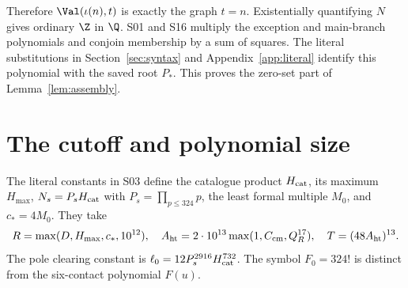 Therefore $\Val(\iota(n),t)$ is exactly the graph $t=n$.
Existentially quantifying $N$ gives ordinary $\Z$ in $\Q$.
S01 and S16 multiply the exception and main-branch polynomials and
conjoin membership by a sum of squares. The literal substitutions in
Section~\ref{sec:syntax} and Appendix~\ref{app:literal} identify this
polynomial with the saved root $P_*$. This proves the zero-set part of
Lemma~\ref{lem:assembly}.



\section{The cutoff and polynomial size}\label{sec:size}
The literal constants in S03 define the catalogue product $H_{\rm cat}$,
its maximum $H_{\max}$, $N_s=P_sH_{\rm cat}$ with
$P_s=\prod_{p\le324}p$, the least formal multiple $M_0$, and $c_*=4M_0$.
They take
\[
 R=\max(D,H_{\max},c_*,10^{12}),\quad
 A_{\rm ht}=2\cdot10^{13}\max(1,C_{\rm cm},Q_R^{17}),\quad
 T=(48A_{\rm ht})^{13}.
\]
The pole clearing constant is $\ell_0=12P_s^{2916}H_{\rm cat}^{732}$.
The symbol $F_0=324!$ is distinct from the six-contact polynomial $F(u)$.

